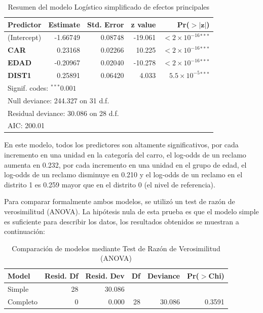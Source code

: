 \begin{table}[H]
\centering
\caption{Resumen del modelo Logístico simplificado de efectos principales}
\label{tab:modelo_simple}
\begin{tabular}{lrrrr}
\toprule
\textbf{Predictor} & \textbf{Estimate} & \textbf{Std. Error} & \textbf{z value} & \textbf{Pr($\mathbf{>|z|}$)} \\
\midrule
(Intercept) & -1.66749 & 0.08748 & -19.061 & $<2 \times 10^{-16}$$^{***}$ \\
\textbf{CAR}         &  0.23168 & 0.02266 &  10.225 & $<2 \times 10^{-16}$$^{***}$ \\
\textbf{EDAD}        & -0.20967 & 0.02040 & -10.278 & $<2 \times 10^{-16}$$^{***}$ \\
\textbf{DIST1}       &  0.25891 & 0.06420 &   4.033 & $5.5 \times 10^{-5}$$^{***}$ \\
\midrule
\multicolumn{5}{l}{\footnotesize Signif. codes: $^{***}0.001$} \\
\multicolumn{5}{l}{\footnotesize Null deviance: 244.327 on 31 d.f.} \\
\multicolumn{5}{l}{\footnotesize Residual deviance: 30.086 on 28 d.f.} \\
\multicolumn{5}{l}{\footnotesize AIC: 200.01} \\
\end{tabular}
\end{table}

En este modelo, todos los predictores son altamente significativos, por cada incremento en una unidad en la categoría del carro, el log-odds de un reclamo aumenta en 0.232, por cada incremento en una unidad en el grupo de edad, el log-odds de un reclamo disminuye en 0.210 y el log-odds de un reclamo en el distrito 1 es 0.259 mayor que en el distrito 0 (el nivel de referencia).

Para comparar formalmente ambos modelos, se utilizó un test de razón de verosimilitud (ANOVA). La hipótesis nula de esta prueba es que el modelo simple es suficiente para describir los datos, los resultados obtenidos se muestran a continuación: 

\begin{table}[H]
\centering
\caption{Comparación de modelos mediante Test de Razón de Verosimilitud (ANOVA)}
\label{tab:anova}
\begin{tabular}{lrrrrr}
\toprule
Model & Resid. Df & Resid. Dev & Df & Deviance & Pr($>$Chi) \\
\midrule
Simple      & 28 & 30.086 &    &        &         \\
Completo    & 0  & 0.000  & 28 & 30.086 & 0.3591  \\
\bottomrule
\end{tabular}
\end{table}


